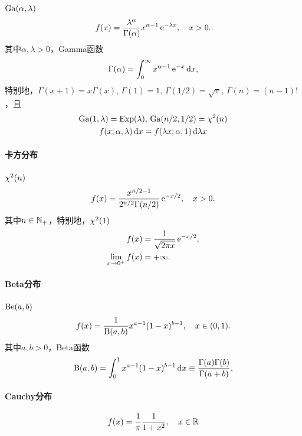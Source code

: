 $\operatorname{Ga}(\alpha,\lambda)$
\begin{equation}
	f(x) = \frac{\lambda^\alpha}{\Gamma(\alpha)}x^{\alpha-1}\mathop{}\!\mathrm{e}^{-\lambda x},\quad x > 0.
\end{equation}
其中$\alpha,\lambda > 0$，Gamma函数
\begin{equation}\label{eq:ps-gamma-integral}
	\Gamma(\alpha) = \int_0^\infty x^{\alpha-1}\mathop{}\!\mathrm{e}^{-x}\mathop{}\!\mathrm{d} x,
\end{equation}
特别地，$\Gamma(x + 1) = x\Gamma(x),\,\Gamma(1) = 1,\,\Gamma(1/2) = \sqrt\pi,\,\Gamma(n) = (n - 1)!$，且
\begin{gather*}
	\operatorname{Ga}(1,\lambda) = \operatorname{Exp}(\lambda),\,\operatorname{Ga}(n/2,1/2) = \chi^2(n)\\
	f(x;\alpha,\lambda)\mathop{}\!\mathrm{d} x = f(\lambda x;\alpha,1)\mathop{}\!\mathrm{d}\lambda x
\end{gather*}

\paragraph{卡方分布}

$\chi^2(n)$
\begin{equation}
	f(x) = \frac{x^{n/2-1}}{2^{n/2}\Gamma(n/2)}\mathop{}\!\mathrm{e}^{-x/2},\quad x > 0.
\end{equation}
其中$n \in \mathbb{N}_+$，特别地，$\chi^2(1)$
\begin{align*}
	f(x) &= \frac1{\sqrt{2\pi x}}\mathop{}\!\mathrm{e}^{-x/2},\\
	\lim_{x\to 0^+}f(x) &= +\infty.
\end{align*}

\paragraph{Beta分布}

$\operatorname{Be}(a,b)$
\begin{equation}
	f(x) = \frac1{\operatorname{B}(a,b)}x^{a-1}(1 - x)^{b-1},\quad x \in (0,1).
\end{equation}
其中$a,b > 0$，Beta函数
\begin{equation}\label{eq:ps-beta-integral}
	\operatorname{B}(a,b) = \int_0^1x^{a-1}(1 - x)^{b-1}\mathop{}\!\mathrm{d} x \equiv \frac{\Gamma(a)\Gamma(b)}{\Gamma(a + b)},
\end{equation}

\paragraph{Cauchy分布}

\begin{equation}
	f(x) = \frac1\pi\frac1{1 + x^2},\quad x \in \mathbb{R}
\end{equation}

